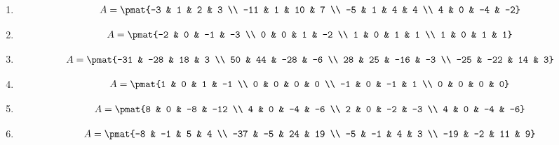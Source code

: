 \begin{enumerate}
\item

\begin{align*}
A = \pmat{-3 & 1 & 2 & 3 \\ -11 & 1 & 10 & 7 \\ -5 & 1 & 4 & 4 \\ 4 & 0 & -4 & -2}
\end{align*}

\item

\begin{align*}
A = \pmat{-2 & 0 & -1 & -3 \\ 0 & 0 & 1 & -2 \\ 1 & 0 & 1 & 1 \\ 1 & 0 & 1 & 1}
\end{align*}

\item

\begin{align*}
A = \pmat{-31 & -28 & 18 & 3 \\ 50 & 44 & -28 & -6 \\ 28 & 25 & -16 & -3 \\ -25 & -22 & 14 & 3}
\end{align*}

\item

\begin{align*}
A = \pmat{1 & 0 & 1 & -1 \\ 0 & 0 & 0 & 0 \\ -1 & 0 & -1 & 1 \\ 0 & 0 & 0 & 0}
\end{align*}

\item

\begin{align*}
A = \pmat{8 & 0 & -8 & -12 \\ 4 & 0 & -4 & -6 \\ 2 & 0 & -2 & -3 \\ 4 & 0 & -4 & -6}
\end{align*}

\item

\begin{align*}
A = \pmat{-8 & -1 & 5 & 4 \\ -37 & -5 & 24 & 19 \\ -5 & -1 & 4 & 3 \\ -19 & -2 & 11 & 9}
\end{align*}


\end{enumerate}
